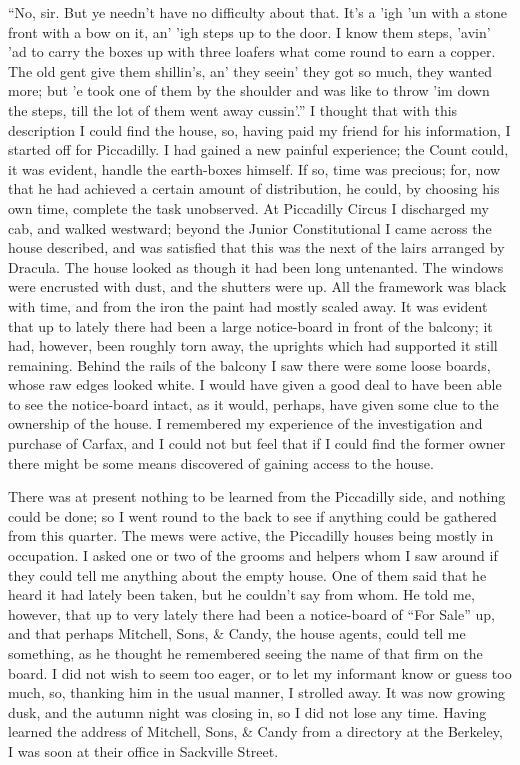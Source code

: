 \documentclass[12pt,openright]{book}
\begin{document}
“No, sir. But ye needn’t have no difficulty about that. It’s a ’igh ’un with a stone front with a bow on it, an’ ’igh steps up to the door. I know them steps, ’avin’ ’ad to carry the boxes up with three loafers what come round to earn a copper. The old gent give them shillin’s, an’ they seein’ they got so much, they wanted more; but ’e took one of them by the shoulder and was like to throw ’im down the steps, till the lot of them went away cussin’.” I thought that with this description I could find the house, so, having paid my friend for his information, I started off for Piccadilly. I had gained a new painful experience; the Count could, it was evident, handle the earth-boxes himself. If so, time was precious; for, now that he had achieved a certain amount of distribution, he could, by choosing his own time, complete the task unobserved. At Piccadilly Circus I discharged my cab, and walked westward; beyond the Junior Constitutional I came across the house described, and was satisfied that this was the next of the lairs arranged by Dracula. The house looked as though it had been long untenanted. The windows were encrusted with dust, and the shutters were up. All the framework was black with time, and from the iron the paint had mostly scaled away. It was evident that up to lately there had been a large notice-board in front of the balcony; it had, however, been roughly torn away, the uprights which had supported it still remaining. Behind the rails of the balcony I saw there were some loose boards, whose raw edges looked white. I would have given a good deal to have been able to see the notice-board intact, as it would, perhaps, have given some clue to the ownership of the house. I remembered my experience of the investigation and purchase of Carfax, and I could not but feel that if I could find the former owner there might be some means discovered of gaining access to the house.

There was at present nothing to be learned from the Piccadilly side, and nothing could be done; so I went round to the back to see if anything could be gathered from this quarter. The mews were active, the Piccadilly houses being mostly in occupation. I asked one or two of the grooms and helpers whom I saw around if they could tell me anything about the empty house. One of them said that he heard it had lately been taken, but he couldn’t say from whom. He told me, however, that up to very lately there had been a notice-board of “For Sale” up, and that perhaps Mitchell, Sons, \& Candy, the house agents, could tell me something, as he thought he remembered seeing the name of that firm on the board. I did not wish to seem too eager, or to let my informant know or guess too much, so, thanking him in the usual manner, I strolled away. It was now growing dusk, and the autumn night was closing in, so I did not lose any time. Having learned the address of Mitchell, Sons, \& Candy from a directory at the Berkeley, I was soon at their office in Sackville Street.
\end{document}
